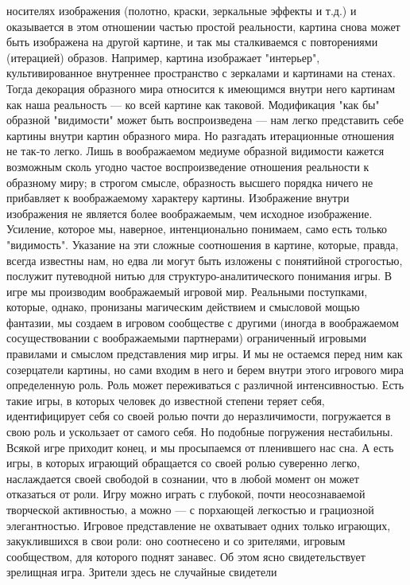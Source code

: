 \documentclass[12pt]{article}
\begin{document}
носителях изображения (полотно, краски, зеркальные эффекты и т.д.) и оказывается в этом отношении частью
простой  реальности,  картина  снова  может  быть  изображена  на  другой  картине,  и  так  мы  сталкиваемся  с
повторениями (итерацией) образов. Например, картина изображает "интерьер", культивированное внутреннее
пространство с зеркалами и картинами на стенах. Тогда декорация образного мира относится к имеющимся
внутри него картинам как наша реальность --- ко всей картине как таковой. Модификация "как бы" образной
"видимости" может быть воспроизведена --- нам легко представить себе картины внутри картин образного мира.
Но разгадать итерационные отношения не так-то легко. Лишь в воображаемом медиуме образной видимости
кажется возможным сколь угодно частое воспроизведение отношения реальности к образному миру; в строгом
смысле, образность высшего порядка ничего не прибавляет к воображаемому характеру картины. Изображение
внутри  изображения  не  является  более  воображаемым,  чем  исходное  изображение.  Усиление,  которое  мы,
наверное, интенционально понимаем, само есть только "видимость". Указание на эти сложные соотношения в
картине, которые, правда, всегда известны нам, но едва ли могут быть изложены с понятийной строгостью,
послужит  путеводной  нитью  для  структуро-аналитического  понимания  игры.  В  игре  мы  производим
воображаемый игровой мир. Реальными поступками, которые, однако, пронизаны магическим действием и
смысловой  мощью  фантазии,  мы  создаем  в  игровом  сообществе  с  другими  (иногда  в  воображаемом
сосуществовании с воображаемыми партнерами) ограниченный игровыми правилами и смыслом представления
мир игры. И мы не остаемся перед ним как созерцатели картины, но сами входим в него и берем внутри этого
игрового мира определенную роль. Роль может переживаться с различной интенсивностью. Есть такие игры, в
которых  человек  до  известной  степени  теряет  себя,  идентифицирует  себя  со  своей  ролью  почти  до
неразличимости, погружается в свою роль и ускользает от самого себя. Но подобные погружения нестабильны.
Всякой игре приходит конец, и мы просыпаемся от пленившего нас сна. А есть игры, в которых играющий
обращается со своей ролью суверенно легко, наслаждается своей свободой в сознании, что в любой момент он
может отказаться от роли. Игру можно играть с глубокой, почти неосознаваемой творческой активностью, а
можно --- с порхающей легкостью и грациозной элегантностью. Игровое представление не охватывает одних
только играющих, закуклившихся в свои роли: оно соотнесено и со зрителями, игровым сообществом, для
которого поднят занавес. Об этом ясно свидетельствует зрелищная игра. Зрители здесь не случайные свидетели
\end{document}
